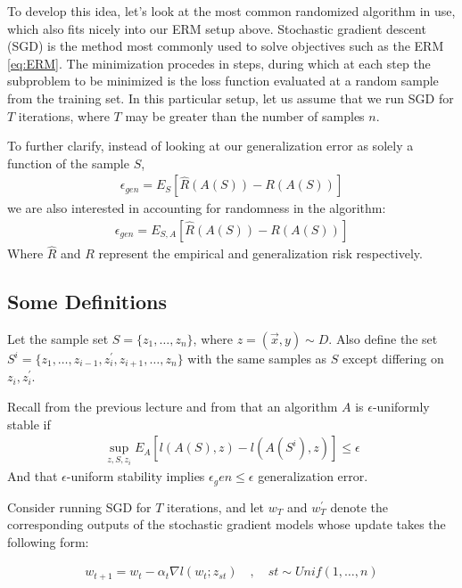 \documentclass[12pt]{report}
\begin{document}
To develop this idea, let's look at the most common randomized algorithm in use, which also fits nicely into our ERM setup above. Stochastic gradient descent (SGD) is the method most commonly used to solve objectives such as the ERM \ref{eq:ERM}. The minimization procedes in steps, during which at each step the subproblem to be minimized is the loss function evaluated at a random sample from the training set. In this particular setup, let us assume that we run SGD for $T$ iterations, where $T$ may be greater than the number of samples $n$.

To further clarify, instead of looking at our generalization error as solely a function of the sample $S$,
\begin{align}
\epsilon_{gen} = E_{S} \left[ \hat{R}(A(S)) - R(A(S))\right]
\end{align}
we are also interested in accounting for randomness in the algorithm:
\begin{align}
\epsilon_{gen} = E_{S,A} \left[ \hat{R}(A(S)) - R(A(S))\right]
\end{align}
Where $\hat{R}$ and $R$ represent the empirical and generalization risk respectively.

\subsection{Some Definitions}
Let the sample set $S = \{z_1,\ldots,z_n\}$, where $z = (\vec{x}, y) \sim D$. Also define the set $S^i = \{z_1,\ldots, z_{i-1}, z_i^\prime,z_{i+1},\ldots,z_n\}$ with the same samples as $S$ except differing on $z_i,z_i^\prime$.

Recall from the previous lecture and from \cite{bousquet2002stability} that an algorithm $A$ is $\epsilon$-uniformly stable if 
\begin{align}
\sup_{z,S,z_i} E_{A} \left[ l(A(S),z) - l(A(S^i),z)\right] \leq \epsilon
\end{align}
And that $\epsilon$-uniform stability implies $\epsilon_gen \leq \epsilon$ generalization error.

Consider running SGD for $T$ iterations, and let $w_T$ and $w_T^\prime$ denote the corresponding outputs of the stochastic gradient models whose update takes the following form:

\begin{align}
w_{t+1} = w_t - \alpha_t \nabla l(w_t;z_{st}) \quad , \quad st \sim Unif(1,\ldots,n)
\end{align}
\end{document}
